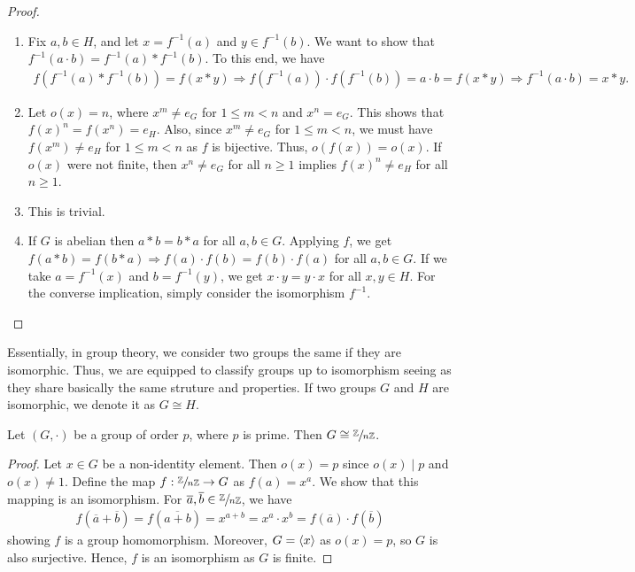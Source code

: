 \begin{proof}
    \begin{enumerate}
        \item Fix $a,b \in H$, and let $x = f^{-1}(a)$ and $y \in f^{-1}(b)$. We want to show that $f^{-1}(a \cdot b) = f^{-1}(a) \ast f^{-1}(b)$. To this end, we have
        \begin{align}
            f(f^{-1}(a) \ast f^{-1}(b)) = f(x \ast y) \Rightarrow f(f^{-1}(a)) \cdot f(f^{-1}(b)) = a \cdot b = f(x \ast y) \Rightarrow f^{-1}(a \cdot b) = x \ast y.
        \end{align}

        \item Let $o(x) = n$, where $x^{m} \neq e_{G}$ for $1 \leq m < n$ and $x^{n} = e_{G}$. This shows that $f(x)^{n} = f(x^{n}) = e_{H}$. Also, since $x^{m} \neq e_{G}$ for $1 \leq m < n$, we must have $f(x^{m}) \neq e_{H}$ for $1 \leq m < n$ as $f$ is bijective. Thus, $o(f(x)) = o(x)$. If $o(x)$ were not finite, then $x^{n} \neq e_{G}$ for all $n \geq 1$ implies $f(x)^{n} \neq e_{H}$ for all $n \geq 1$.
        
        \item This is trivial.
        
        \item If $G$ is abelian then $a \ast b = b \ast a$ for all $a,b \in G$. Applying $f$, we get $f(a \ast b) = f(b \ast a) \Rightarrow f(a) \cdot f(b) = f(b) \cdot f(a)$ for all $a,b \in G$. If we take $a = f^{-1}(x)$ and $b = f^{-1}(y)$, we get $x \cdot y = y \cdot x$ for all $x,y \in H$. For the converse implication, simply consider the isomorphism $f^{-1}$.
    \end{enumerate}
\end{proof}

Essentially, in group theory, we consider two groups the same if they are isomorphic. Thus, we are equipped to classify groups up to isomorphism seeing as they share basically the same struture and properties. If two groups $G$ and $H$ are isomorphic, we denote it as $G \cong H$.

\begin{proposition}
    Let $(G,\cdot)$ be a group of order $p$, where $p$ is prime. Then $G \cong \sfrac{\mathbb{Z}}{n\mathbb{Z}}$.
\end{proposition}

\begin{proof}
    Let $x \in G$ be a non-identity element. Then $o(x) = p$ since $o(x) \mid p$ and $o(x) \neq 1$. Define the map $f:\sfrac{\mathbb{Z}}{n\mathbb{Z}} \to G$ as $f(a) = x^{a}$. We show that this mapping is an isomorphism. For $\overline{a},\overline{b} \in \sfrac{\mathbb{Z}}{n\mathbb{Z}}$, we have
    \begin{align}
        f(\overline{a} + \overline{b}) = f(\overline{a+b}) = x^{a+b} = x^{a} \cdot x^{b} = f(\overline{a}) \cdot f(\overline{b})
    \end{align}
    showing $f$ is a group homomorphism. Moreover, $G = \langle x\rangle$ as $o(x) = p$, so $G$ is also surjective. Hence, $f$ is an isomorphism as $G$ is finite.
\end{proof}

